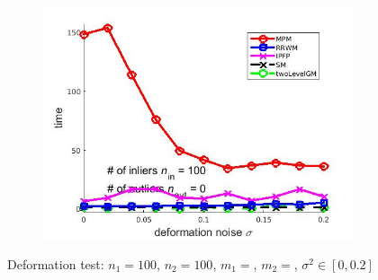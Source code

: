 \documentclass[
	fontsize=12pt,
	paper=a4,
	twoside=false,
	numbers=noenddot,
	plainheadsepline,
	toc=listof,
	toc=bibliography
]{scrartcl}
\begin{document}
\begin{figure}[ht]
\begin{subfigure}[b]{0.3\textwidth}
		\includegraphics[scale=0.25]{"fig_ver2008/syntheticPointSets/deformation_test/time_greedy"} 
	\end{subfigure} 	
	\caption{ Deformation test: $n_1=100$, $n_2=100$, $m_1=$, $m_2=$, $\sigma^2\in[0, 0.2]$}
\end{figure}

\FloatBarrier	
\end{document}
